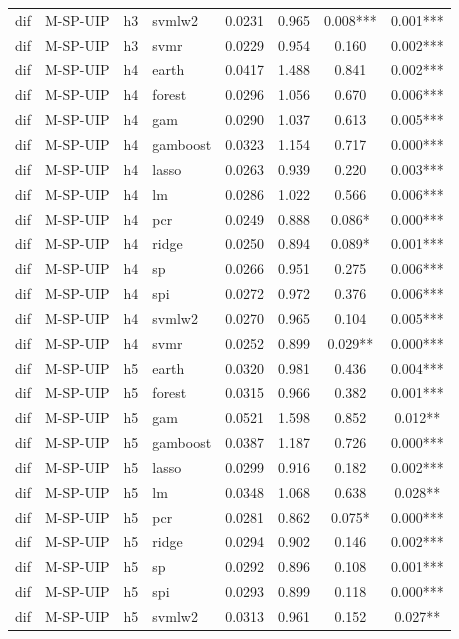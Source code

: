 \begin{ThreePartTable}
\begin{longtable}[t]{llclcccc}
dif & M-SP-UIP & h3 & svmlw2 & 0.0231 & 0.965 & 0.008*** & 0.001***\\
dif & M-SP-UIP & h3 & svmr & 0.0229 & 0.954 & 0.160 & 0.002***\\
\addlinespace
dif & M-SP-UIP & h4 & earth & 0.0417 & 1.488 & 0.841 & 0.002***\\
dif & M-SP-UIP & h4 & forest & 0.0296 & 1.056 & 0.670 & 0.006***\\
dif & M-SP-UIP & h4 & gam & 0.0290 & 1.037 & 0.613 & 0.005***\\
dif & M-SP-UIP & h4 & gamboost & 0.0323 & 1.154 & 0.717 & 0.000***\\
dif & M-SP-UIP & h4 & lasso & 0.0263 & 0.939 & 0.220 & 0.003***\\
dif & M-SP-UIP & h4 & lm & 0.0286 & 1.022 & 0.566 & 0.006***\\
dif & M-SP-UIP & h4 & pcr & 0.0249 & 0.888 & 0.086* & 0.000***\\
dif & M-SP-UIP & h4 & ridge & 0.0250 & 0.894 & 0.089* & 0.001***\\
dif & M-SP-UIP & h4 & sp & 0.0266 & 0.951 & 0.275 & 0.006***\\
dif & M-SP-UIP & h4 & spi & 0.0272 & 0.972 & 0.376 & 0.006***\\
dif & M-SP-UIP & h4 & svmlw2 & 0.0270 & 0.965 & 0.104 & 0.005***\\
dif & M-SP-UIP & h4 & svmr & 0.0252 & 0.899 & 0.029** & 0.000***\\
\addlinespace
dif & M-SP-UIP & h5 & earth & 0.0320 & 0.981 & 0.436 & 0.004***\\
dif & M-SP-UIP & h5 & forest & 0.0315 & 0.966 & 0.382 & 0.001***\\
dif & M-SP-UIP & h5 & gam & 0.0521 & 1.598 & 0.852 & 0.012**\\
dif & M-SP-UIP & h5 & gamboost & 0.0387 & 1.187 & 0.726 & 0.000***\\
dif & M-SP-UIP & h5 & lasso & 0.0299 & 0.916 & 0.182 & 0.002***\\
dif & M-SP-UIP & h5 & lm & 0.0348 & 1.068 & 0.638 & 0.028**\\
dif & M-SP-UIP & h5 & pcr & 0.0281 & 0.862 & 0.075* & 0.000***\\
dif & M-SP-UIP & h5 & ridge & 0.0294 & 0.902 & 0.146 & 0.002***\\
dif & M-SP-UIP & h5 & sp & 0.0292 & 0.896 & 0.108 & 0.001***\\
dif & M-SP-UIP & h5 & spi & 0.0293 & 0.899 & 0.118 & 0.000***\\
dif & M-SP-UIP & h5 & svmlw2 & 0.0313 & 0.961 & 0.152 & 0.027**\\

\end{longtable}
\end{ThreePartTable}

